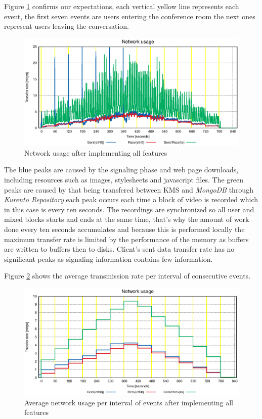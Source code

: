       Figure \ref{fig:test_full_features_net} confirms our expectations, each vertical yellow line represents each event, the first seven events are users entering the conference room the next ones represent users leaving the conversation. 
      

\begin{figure}[!htb]
  \centering
  \includegraphics[width=\textwidth]{stats/test_full_features_net.eps}
  \caption{Network usage after implementing all features}
  \label{fig:test_full_features_net}
\end{figure}


      The blue peaks are caused by the signaling phase and web page downloads, including resources such as images, stylesheets and javascript files. 
      The green peaks are caused by that being transfered between \ac{KMS} and \emph{MongoDB} through \emph{Kurento Repository} each peak occurs each time a block of video is recorded which in this case is every ten seconds. 
      The recordings are synchronized so all user and mixed blocks starts and ends at the same time, that's why the amount of work done every ten seconds accumulates and because this is performed locally the maximum transfer rate is limited by the performance of the memory as buffers are written to buffers then to disks. 
      Client's sent data transfer rate has no significant peaks as signaling information contains few information.

      Figure \ref{fig:summary_full_net} shows the average transmission rate per interval of consecutive events. 


\begin{figure}[!htb]
  \centering
  \includegraphics[width=\textwidth]{stats/summary_full_net.eps}
  \caption{Average network usage per interval of events after implementing all features}
  \label{fig:summary_full_net}
\end{figure}



